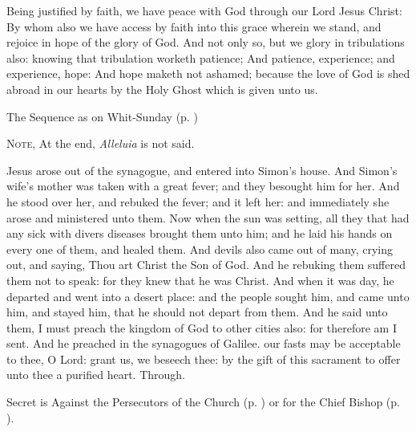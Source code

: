 \vspace{-0.5ex}

 Being justified by faith, we have peace with God through our Lord Jesus Christ: By whom also we have access by faith into this grace wherein we stand, and rejoice in hope of the glory of God. And not only so, but we glory in tribulations also: knowing that tribulation worketh patience; And patience, experience; and experience, hope: And hope maketh not ashamed; because the love of God is shed abroad in our hearts by the Holy Ghost which is given unto us.
\begin{rubric}
{The Sequence as on Whit-Sunday (p. \pageref{WhitSeq})}
\end{rubric}
\begin{rubric}
    \textsc{Note,} At the end, \emph{Alleluia} is not said.
\end{rubric}
 Jesus arose out of the synagogue, and entered into Simon's house. And Simon's wife's mother was taken with a great fever; and they besought him for her. And he stood over her, and rebuked the fever; and it left her: and immediately she arose and ministered unto them. Now when the sun was setting, all they that had any sick with divers diseases brought them unto him; and he laid his hands on every one of them, and healed them. And devils also came out of many, crying out, and saying, Thou art Christ the Son of God. And he rebuking them suffered them not to speak: for they knew that he was Christ. And when it was day, he departed and went into a desert place: and the people sought him, and came unto him, and stayed him, that he should not depart from them. And he said unto them, I must preach the kingdom of God to other cities also: for therefore am I sent. And he preached in the synagogues of Galilee.
\secret
{} our fasts may be acceptable to thee, O Lord: grant us, we beseech thee: by the gift of this sacrament to offer unto thee a purified heart. Through.
\begin{rubric}
     Secret is Against the Persecutors of the Church (p. \pageref{SPAgainst}) or for the Chief Bishop (p. \pageref{SPChiefBishop}).
\end{rubric}

